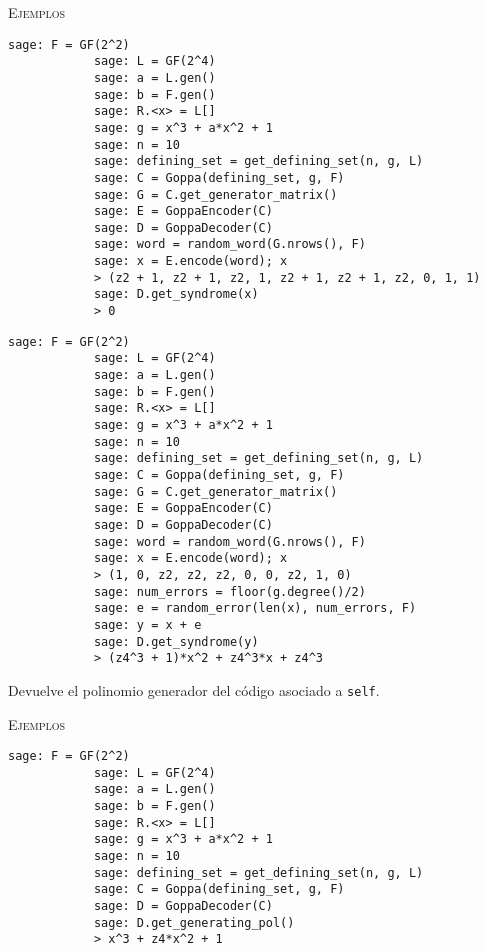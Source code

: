 \begin{description}[leftmargin=1em, font=\normalfont\ttfamily, style=nextline]
\begin{description}[font=\ttfamily, style=nextline]
        \textsc{Ejemplos}
        \begin{lstlisting}[gobble=4]
            sage: F = GF(2^2)
            sage: L = GF(2^4)
            sage: a = L.gen()
            sage: b = F.gen()
            sage: R.<x> = L[]
            sage: g = x^3 + a*x^2 + 1
            sage: n = 10
            sage: defining_set = get_defining_set(n, g, L)
            sage: C = Goppa(defining_set, g, F)
            sage: G = C.get_generator_matrix()
            sage: E = GoppaEncoder(C)
            sage: D = GoppaDecoder(C)
            sage: word = random_word(G.nrows(), F)
            sage: x = E.encode(word); x
            > (z2 + 1, z2 + 1, z2, 1, z2 + 1, z2 + 1, z2, 0, 1, 1)
            sage: D.get_syndrome(x)
            > 0
        \end{lstlisting}
        \begin{lstlisting}[gobble=4]
            sage: F = GF(2^2)
            sage: L = GF(2^4)
            sage: a = L.gen()
            sage: b = F.gen()
            sage: R.<x> = L[]
            sage: g = x^3 + a*x^2 + 1
            sage: n = 10
            sage: defining_set = get_defining_set(n, g, L)
            sage: C = Goppa(defining_set, g, F)
            sage: G = C.get_generator_matrix()
            sage: E = GoppaEncoder(C)
            sage: D = GoppaDecoder(C)
            sage: word = random_word(G.nrows(), F)
            sage: x = E.encode(word); x
            > (1, 0, z2, z2, z2, 0, 0, z2, 1, 0)
            sage: num_errors = floor(g.degree()/2)
            sage: e = random_error(len(x), num_errors, F)
            sage: y = x + e
            sage: D.get_syndrome(y)
            > (z4^3 + 1)*x^2 + z4^3*x + z4^3
        \end{lstlisting}

        \item[get\_generating\_pol(self)] Devuelve el polinomio generador del código asociado a \texttt{self}.
        
        \textsc{Ejemplos}
        \begin{lstlisting}[gobble=4]
            sage: F = GF(2^2)
            sage: L = GF(2^4)
            sage: a = L.gen()
            sage: b = F.gen()
            sage: R.<x> = L[]
            sage: g = x^3 + a*x^2 + 1
            sage: n = 10
            sage: defining_set = get_defining_set(n, g, L)
            sage: C = Goppa(defining_set, g, F)
            sage: D = GoppaDecoder(C)
            sage: D.get_generating_pol()
            > x^3 + z4*x^2 + 1
        \end{lstlisting}


\end{description}
\end{description}
